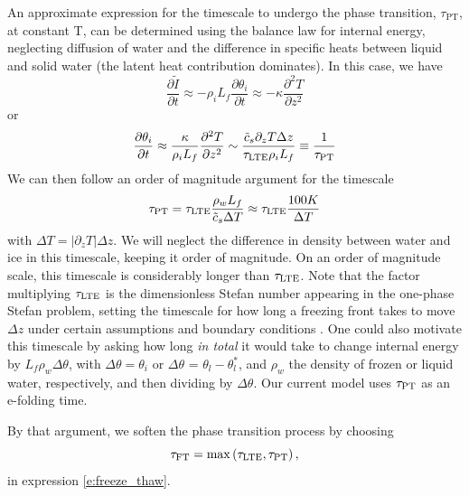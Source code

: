 \documentclass[twoside,10pt]{report}
\begin{document}
An approximate expression for the timescale to undergo the phase transition, $\tau_{\mathrm{PT}}$, at constant T, can be determined using the balance law for internal energy, neglecting diffusion of water and the difference in specific heats between liquid and solid water (the latent heat contribution dominates). In this case, we have 
\begin{equation}\label{e:idot_during_pt}
    \frac{\partial \tilde{I}}{\partial t} \approx -\rho_i L_f \frac{\partial \theta_i}{\partial t} \approx -\kappa \frac{\partial^2 T}{\partial z^2}
\end{equation}
or 
\begin{equation}\label{e:idot_during_pt2}
    \frac{\partial \theta_i}{\partial t} \approx \frac{\kappa}{\rho_i L_f} \frac{\partial^2 T}{\partial z^2} \sim \frac{\tilde{c}_s \partial_z T \Delta z}{\tau_{\rm LTE} \rho_i L_f} \equiv \frac{1}{\tau_{\rm PT}}
\end{equation}
We can then follow an order of magnitude argument for the timescale
\begin{equation}
    \tau_{\rm PT} = \tau_{\rm LTE} \frac{\rho_w L_f }{\tilde{c}_s \Delta T} \approx \tau_{\rm LTE} \frac{100 K}{\Delta T}
\end{equation}
with $\Delta T = |\partial_z T| \Delta z$. We will neglect the difference in density between water and ice in this timescale, keeping it order of magnitude. On an order of magnitude scale, this timescale is considerably longer than $\tau_{\rm LTE}$. Note that the factor multiplying $\tau_{\rm LTE}$ is the dimensionless Stefan number appearing in the one-phase Stefan problem, setting the timescale for how long a freezing front takes to move $\Delta z$ under certain assumptions and boundary conditions \cite{Alexiadesbook}. One could also motivate this timescale by asking how long \emph{in total} it would take to change internal energy by $L_f\rho_w\Delta \theta$, with $\Delta \theta = \theta_i$ or $\Delta \theta$ = $\theta_l - \theta_l^*$, and $\rho_w$ the density of frozen or liquid water, respectively, and then dividing by $\Delta \theta$. Our current model uses $\tau_{\rm PT}$ as an e-folding time.

By that argument, we soften the phase transition process by choosing
\begin{equation}
    \tau_{\mathrm{FT}} = \max\left(\tau_{\mathrm{LTE}},\tau_{\rm PT}\right),
\end{equation}
in expression \eqref{e:freeze_thaw}. 
\end{document}
